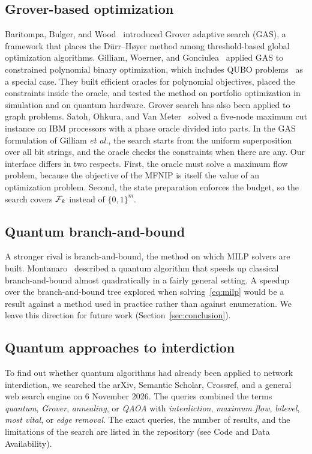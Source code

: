\subsection{Grover-based optimization}\label{sec:rel-gas}

Baritompa, Bulger, and Wood~\cite{baritompa2005} introduced Grover adaptive search (GAS), a framework that places the D\"urr--H{\o}yer method among threshold-based global optimization algorithms. Gilliam, Woerner, and Gonciulea~\cite{gilliam2021} applied GAS to constrained polynomial binary optimization, which includes QUBO problems~\cite{lucas2014,glover2019} as a special case. They built efficient oracles for polynomial objectives, placed the constraints inside the oracle, and tested the method on portfolio optimization in simulation and on quantum hardware. Grover search has also been applied to graph problems. Satoh, Ohkura, and Van Meter~\cite{satoh2020} solved a five-node maximum cut instance on IBM processors with a phase oracle divided into parts. In the GAS formulation of Gilliam \emph{et al.}, the search starts from the uniform superposition over all bit strings, and the oracle checks the constraints when there are any. Our interface differs in two respects. First, the oracle must solve a maximum flow problem, because the objective of the MFNIP is itself the value of an optimization problem. Second, the state preparation enforces the budget, so the search covers $\mathcal{F}_k$ instead of $\{0,1\}^{m}$.

\subsection{Quantum branch-and-bound}\label{sec:rel-limits}

A stronger rival is branch-and-bound, the method on which MILP solvers are built. Montanaro~\cite{montanaro2020} described a quantum algorithm that speeds up classical branch-and-bound almost quadratically in a fairly general setting. A speedup over the branch-and-bound tree explored when solving~\eqref{eq:milp} would be a result against a method used in practice rather than against enumeration. We leave this direction for future work (Section~\ref{sec:conclusion}).

\subsection{Quantum approaches to interdiction}\label{sec:rel-novelty}

To find out whether quantum algorithms had already been applied to network interdiction, we searched the arXiv, Semantic Scholar, Crossref, and a general web search engine on 6 November 2026. The queries combined the terms \emph{quantum}, \emph{Grover}, \emph{annealing}, or \emph{QAOA} with \emph{interdiction}, \emph{maximum flow}, \emph{bilevel}, \emph{most vital}, or \emph{edge removal}. The exact queries, the number of results, and the limitations of the search are listed in the repository (see Code and Data Availability).

